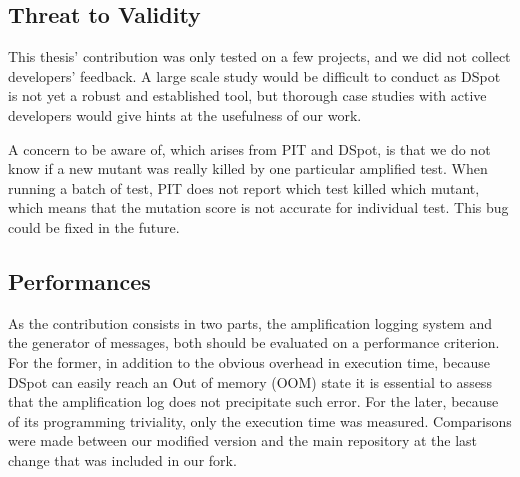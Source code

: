\documentclass[a4paper,11pt]{sdm_internship}
\newcommand{\dspot}{DSpot\xspace}
\theoremstyle{definition}
\begin{document}
\subsection{Threat to Validity}%
\label{ssec:threat_to_validity}
This thesis' contribution was only tested on a few projects, and we did not collect developers' feedback.
A large scale study would be difficult to conduct as \dspot{} is not yet a robust and established tool, but thorough case studies with active developers would give hints at the usefulness of our work.

A concern to be aware of, which arises from PIT and \dspot{}, is that we do not know if a new mutant was really killed by one particular amplified test.
When running a batch of test, PIT does not report which test killed which mutant, which means that the mutation score is not accurate for individual test.
This bug could be fixed in the future.


\subsection{Performances}%
\label{ssec:performances}
As the contribution consists in two parts, the amplification logging system and the generator of messages, both should be evaluated on a performance criterion.
For the former, in addition to the obvious overhead in execution time, because \dspot{} can easily reach an Out of memory (OOM) state it is essential to assess that the amplification log does not precipitate such error.
For the later, because of its programming triviality, only the execution time was measured.
Comparisons were made between our modified version and the main repository at the last change that was included in our fork.
\end{document}
